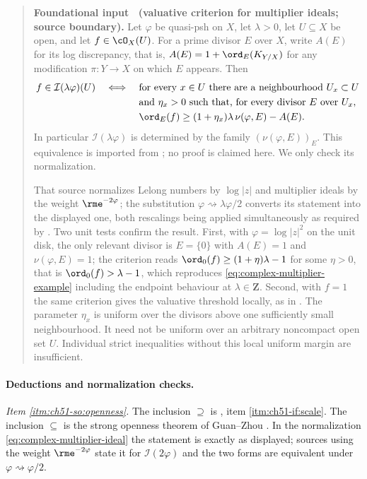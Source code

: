 \label{prop:ch51-valuative-criterion}
\begin{quote}
\textbf{Foundational input \theproposition\ (valuative criterion for
multiplier ideals; source boundary).}
Let $\varphi$ be quasi-psh on $X$, let $\lambda>0$, let $U\subseteq
X$ be open, and let $f\in\cO_X(U)$.  For a prime divisor $E$ over
$X$, write $A(E)$ for its log discrepancy, that is,
$A(E)=1+\ord_E(K_{Y/X})$ for any modification $\pi:Y\to X$ on which
$E$ appears.  Then
\[
 f\in\mathcal I(\lambda\varphi)(U)
 \quad\Longleftrightarrow\quad
 \begin{aligned}[t]
 &\text{for every }x\in U\text{ there are a neighbourhood }U_x\subset U\\
 &\text{and }\eta_x>0\text{ such that, for every divisor }E\text{ over }U_x,\\
 &\ord_E(f)\geq(1+\eta_x)\lambda\,\nu(\varphi,E)-A(E).
 \end{aligned}
\]
In particular $\mathcal I(\lambda\varphi)$ is determined by the family
$(\nu(\varphi,E))_E$.
This equivalence is imported from \cite[Corollary~10.18]{Bou17}; no proof
is claimed here.  We only check its normalization.

That source normalizes Lelong
numbers by $\log|z|$ and multiplier ideals by the weight
$\rme^{-2\varphi}$; the substitution
$\varphi\rightsquigarrow\lambda\varphi/2$ converts its statement into the
displayed one, both rescalings being applied simultaneously as required by
.  Two unit tests confirm the result.  First, with
$\varphi=\log|z|^2$ on the unit disk, the only relevant divisor is
$E=\{0\}$ with $A(E)=1$ and $\nu(\varphi,E)=1$; the criterion reads
$\ord_0(f)\geq(1+\eta)\lambda-1$ for some $\eta>0$, that is
$\ord_0(f)>\lambda-1$, which reproduces
\eqref{eq:complex-multiplier-example} including the endpoint behaviour at
$\lambda\in\mathbf Z$.  Second, with $f=1$ the same criterion gives the valuative threshold
locally, as in .  The parameter $\eta_x$ is uniform
over the divisors above one sufficiently small neighbourhood.  It need
not be uniform over an arbitrary noncompact open set $U$.  Individual
strict inequalities without this local uniform margin are insufficient.
\end{quote}

\paragraph{Deductions and normalization checks.}
\emph{Item \cref{itm:ch51-so:openness}.}  The inclusion $\supseteq$ is
, item \cref{itm:ch51-if:scale}.  The
inclusion $\subseteq$ is the strong openness theorem of Guan--Zhou
\cite[Theorem~1.1]{GZ15}.  In the normalization
\eqref{eq:complex-multiplier-ideal} the statement is exactly as displayed;
sources using the weight $\rme^{-2\varphi}$ state it for
$\mathcal I(2\varphi)$ and the two forms are equivalent under
$\varphi\rightsquigarrow\varphi/2$.

